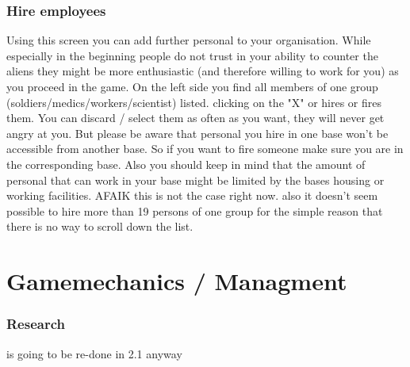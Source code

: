 \subsubsection{Hire employees}
Using this screen you can add further personal to your organisation. While especially in the beginning people do not trust in your ability to counter the aliens they might be more enthusiastic (and therefore willing to work for you) as you proceed in the game. On the left side you find all members of one group (soldiers/medics/workers/scientist) listed. clicking on the "X" or \surd hires or fires them. You can discard / select them as often as you want, they will never get angry at you. But please be aware that personal you hire in one base won't be accessible from another base. So if you want to fire someone make sure you are in the corresponding base. Also you should keep in mind that the amount of personal that can work in your base might be limited by the bases housing or working facilities. AFAIK this is not the case right now. also it doesn't seem possible to hire more than 19 persons of one group for the simple reason that there is no way to scroll down the list.

\section{Gamemechanics / Managment}
\subsubsection{Research}
is going to be re-done in 2.1 anyway
